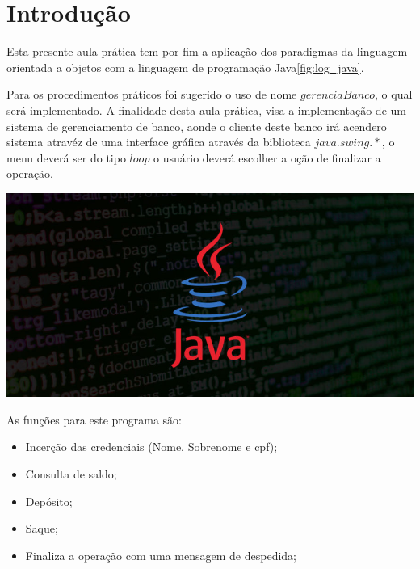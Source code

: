 
\section{Introdução}


\noindent \begin{minipage}[c]{0.6\textwidth}
  \vspace {1cm}
  \par Esta presente aula prática tem por fim a aplicação dos paradigmas da linguagem orientada a objetos com a linguagem de programação Java\ref{fig:log_java}.
  \par Para os procedimentos práticos foi sugerido o uso de nome $gerenciaBanco$, o qual será implementado. A finalidade desta aula prática, visa a implementação de um sistema de gerenciamento de banco, aonde o cliente deste banco irá acendero sistema atravéz de uma interface gráfica através da biblioteca $java.swing.*$, o menu deverá ser do tipo $loop$ o usuário deverá escolher a oção de finalizar a operação.

\end{minipage}
\begin{minipage}[c]{0.4\textwidth}

  \includegraphics[width=\textwidth]{figure/log_java.jpg}
  	\label{fig:log_java}
\end{minipage}

\par As funções para este programa são:
\begin{itemize}
  \item Incerção das credenciais (Nome, Sobrenome e cpf);
  \item Consulta de saldo;
  \item Depósito;
  \item Saque;
  \item Finaliza a operação com uma mensagem de despedida;
\end{itemize}

